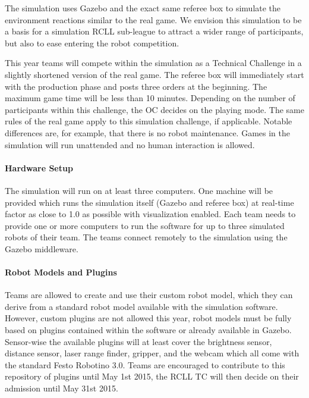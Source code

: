 \documentclass[12pt,twoside]{article}
\begin{document}
The simulation uses Gazebo and the exact same referee box to simulate
the environment reactions similar to the real game. We envision this
simulation to be a basis for a simulation RCLL sub-league to attract a
wider range of participants, but also to ease entering the robot
competition.

This year teams will compete within the simulation as a Technical
Challenge in a slightly shortened version of the real game. The
referee box will immediately start with the production phase and posts
three orders at the beginning. The maximum game time will
be less than 10 minutes. Depending on the number of participants
within this challenge, the OC decides on the playing mode. The same
rules of the real game apply to this simulation challenge, if
applicable. Notable differences are, for example, that there is no
robot maintenance. Games in the simulation will run unattended and no
human interaction is allowed.

\vspace{-2ex}\paragraph{Hardware Setup} The simulation will run on at
least three computers. One machine will be provided which runs the
simulation itself (Gazebo and referee box) at real-time factor as
close to 1.0 as possible with visualization enabled. Each team needs
to provide one or more computers to run the software for up to three
simulated robots of their team. The teams connect remotely to the
simulation using the Gazebo middleware.

\vspace{-2ex}\paragraph{Robot Models and Plugins} Teams are allowed to
create and use their custom robot model, which they can derive from a
standard robot model available with the simulation software. However,
custom plugins are not allowed this year, robot models must be fully
based on plugins contained within the software or already available in
Gazebo. Sensor-wise the available plugins will at least cover the
brightness sensor, distance sensor, laser range finder, gripper, and
the webcam which all come with the standard Festo Robotino 3.0. Teams
are encouraged to contribute to this repository of plugins until May
1st 2015, the RCLL TC will then decide on their admission until May
31st 2015.
\end{document}
